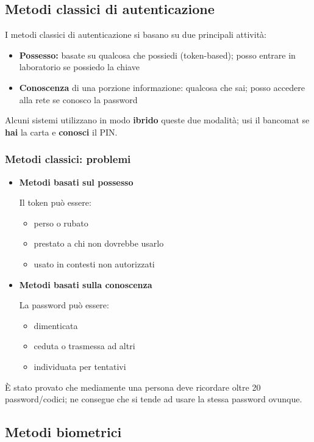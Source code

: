\subsection{Metodi classici di autenticazione}
I metodi classici di autenticazione si basano su due principali attività:
\begin{itemize}
    \item \textbf{Possesso:} basate su qualcosa che possiedi (token-based); posso entrare in laboratorio se possiedo la chiave
    \item \textbf{Conoscenza} di una porzione informazione: qualcosa che sai; posso accedere alla rete se conosco la password
\end{itemize}
Alcuni sistemi utilizzano in modo \textbf{ibrido} queste due modalità; usi il bancomat se \textbf{hai} la carta e \textbf{conosci} il PIN.

\subsubsection{Metodi classici: problemi}

\begin{itemize}
    \item  \textbf{Metodi basati sul possesso}
    
    Il token può essere:
    \begin{itemize}
        \item perso o rubato
        \item prestato a chi non dovrebbe usarlo
        \item usato in contesti non autorizzati
    \end{itemize}
    \item \textbf{Metodi basati sulla conoscenza}
    
    La password può essere:
    \begin{itemize}
        \item dimenticata
        \item ceduta o trasmessa ad altri
        \item individuata per tentativi
    \end{itemize}
\end{itemize}

È stato provato che mediamente una persona deve ricordare oltre 20 password/codici; ne consegue che si tende ad usare la stessa password ovunque.

\subsection{Metodi biometrici}

